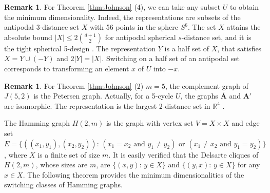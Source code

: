 \documentclass[a4paper, 11pt]{article}
\newcommand{\A}{\boldsymbol{A}}
\theoremstyle{definition}
\newtheorem{remark}[theorem]{Remark}
\begin{document}
\begin{remark}
For Theorem \ref{thm:Johnson} (4), we can take any subset $U$ to obtain the minimum dimensionality. 
Indeed, the representations are subsets of the antipodal 3-distance set $X$ with 56 points in the sphere $S^6$. 
The set $X$ attains the absolute bound $|X| \leq 2 \binom{d+1}{2}$ for antipodal spherical $s$-distance set, and it is the tight spherical 5-design \cite{DGS77}. 
The representation $Y$ is a half set of $X$, that satisfies $X=Y\cup (-Y)$ and $2|Y|=|X|$. 
Switching on a half set of an antipodal set corresponds to transforming an element $x$ of $U$ into $-x$.
\end{remark}

\begin{remark}
For Theorem \ref{thm:Johnson} (2) $m=5$, the complement graph of $J(5,2)$ is the Petersen graph. 
Actually, for a 5-cycle $U$, the graphs $\overline{\A}$ and $\A'$ are isomorphic. 
The representation is the largest 2-distance set in $\mathbb{R}^4$ \cite{L97}. 
\end{remark}












The Hamming graph $H(2,m)$ is the graph with vertex set 
$V = X \times X$ and edge set 
$E = \{ ((x_1, y_1), (x_2, y_2)) \colon\, (x_1 = x_2 \text{ and } y_1 \ne y_2) \text{ or } (x_1 \ne x_2 \text{ and } y_1 = y_2) \}$, 
where $X$ is a finite set of size $m$. 
It is easily verified that the Delsarte cliques of $H(2,m)$, whose sizes are $m$, are 
$\{(x,y) \colon\, y \in X\}$ and $\{(y,x) \colon\, y \in X\}$ for any $x \in X$. 
The following theorem provides the minimum dimensionalities of the switching classes of Hamming graphs.
\end{document}
